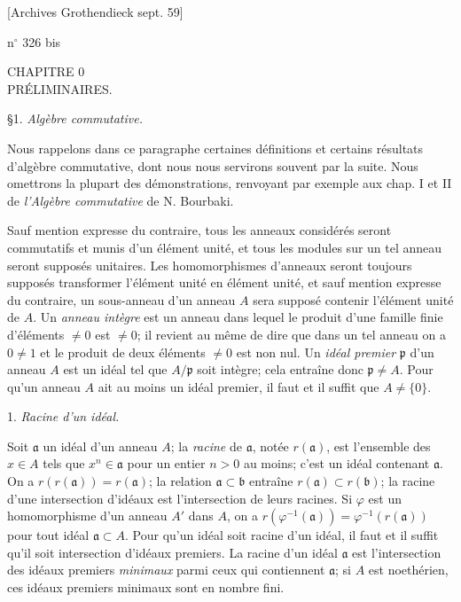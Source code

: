 
[Archives Grothendieck sept. 59]
\begin{flushright}
n$^\circ$ 326 bis
\end{flushright}

\begin{center}
CHAPITRE 0 \\
PRÉLIMINAIRES.
\end{center}

\begin{center}
§1. \emph{Algèbre commutative.}
\end{center}

Nous rappelons dans ce paragraphe certaines définitions et certains résultats d'algèbre commutative, dont nous nous servirons souvent par la suite. Nous omettrons la plupart des démonstrations, renvoyant par exemple aux chap. I et II de \emph{l'Algèbre commutative} de N. Bourbaki.

Sauf mention expresse du contraire, tous les anneaux considérés seront commutatifs et munis d'un élément unité, et tous les modules sur un tel anneau seront supposés unitaires. Les homomorphismes d'anneaux seront toujours supposés transformer l'élément unité en élément unité, et sauf mention expresse du contraire, un sous-anneau d'un anneau $A$ sera supposé contenir l'élément unité de $A$. Un \emph{anneau intègre} est un anneau dans lequel le produit d'une famille finie d'éléments $\neq 0$ est $\neq 0$; il revient au même de dire que dans un tel anneau on a $0 \neq 1$ et le produit de deux éléments $\neq 0$ est non nul. Un \emph{idéal premier} $\mathfrak{p}$ d'un anneau $A$ est un idéal tel que $A/\mathfrak{p}$ soit intègre; cela entraîne donc $\mathfrak{p} \neq A$. Pour qu'un anneau $A$ ait au moins un idéal premier, il faut et il suffit que $A \neq \{0\}$.

1. \emph{Racine d'un idéal.}

Soit $\mathfrak{a}$ un idéal d'un anneau $A$; la \emph{racine} de $\mathfrak{a}$, notée $r(\mathfrak{a})$, est l'ensemble des $x \in A$ tels que $x^n \in \mathfrak{a}$ pour un entier $n > 0$ au moins; c'est un idéal contenant $\mathfrak{a}$. On a $r(r(\mathfrak{a})) = r(\mathfrak{a})$; la relation $\mathfrak{a} \subset \mathfrak{b}$ entraîne $r(\mathfrak{a}) \subset r(\mathfrak{b})$; la racine d'une intersection d'idéaux est l'intersection de leurs racines. Si $\varphi$ est un homomorphisme d'un anneau $A'$ dans $A$, on a $r(\varphi^{-1}(\mathfrak{a})) = \varphi^{-1}(r(\mathfrak{a}))$ pour tout idéal $\mathfrak{a} \subset A$. Pour qu'un idéal soit racine d'un idéal, il faut et il suffit qu'il soit intersection d'idéaux premiers. La racine d'un idéal $\mathfrak{a}$ est l'intersection des idéaux premiers \emph{minimaux} parmi ceux qui contiennent $\mathfrak{a}$; si $A$ est noethérien, ces idéaux premiers minimaux sont en nombre fini.

